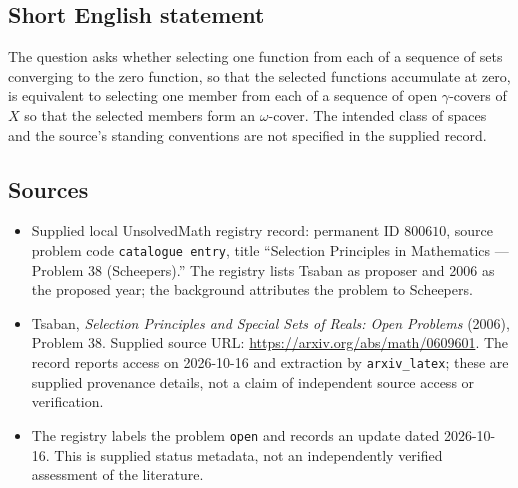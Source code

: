 \documentclass[11pt]{article}
\begin{document}
\subsection{Short English statement}
The question asks whether selecting one function from each of a sequence of sets converging to the zero function, so that the selected functions accumulate at zero, is equivalent to selecting one member from each of a sequence of open \(\gamma\)-covers of \(X\) so that the selected members form an \(\omega\)-cover. The intended class of spaces and the source's standing conventions are not specified in the supplied record.
\subsection{Sources}
\begin{itemize}
\item Supplied local UnsolvedMath registry record: permanent ID \(800610\), source problem code \texttt{catalogue entry}, title ``Selection Principles in Mathematics --- Problem 38 (Scheepers).'' The registry lists Tsaban as proposer and 2006 as the proposed year; the background attributes the problem to Scheepers.
\item Tsaban, \emph{Selection Principles and Special Sets of Reals: Open Problems} (2006), Problem 38. Supplied source URL: \url{https://arxiv.org/abs/math/0609601}. The record reports access on 2026-10-16 and extraction by \texttt{arxiv\_latex}; these are supplied provenance details, not a claim of independent source access or verification.
\item The registry labels the problem \texttt{open} and records an update dated 2026-10-16. This is supplied status metadata, not an independently verified assessment of the literature.
\end{itemize}
\end{document}
